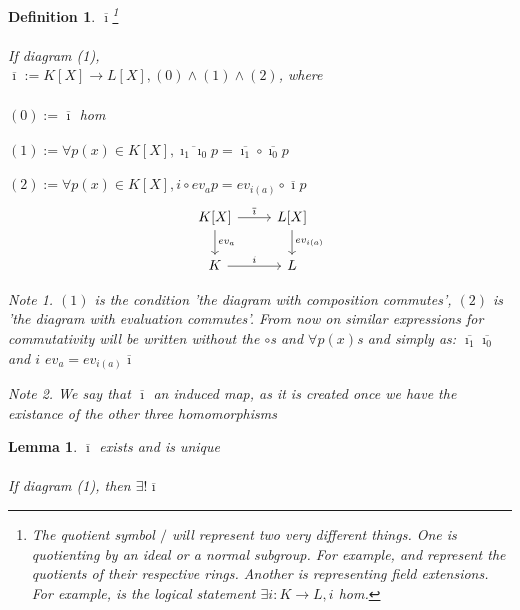 \documentclass{article}
\theoremstyle{definitionstyle}
\newtheorem{defn}{Definition}[section]
\theoremstyle{lemmastyle}
\newtheorem{lem}{Lemma}[section]
\theoremstyle{remark}
\newtheorem*{note}{Note}
\newcommand{\ibar}{\overline{\imath}}
\begin{document}
\begin{defn} $\ibar$\footnote{The quotient symbol $/$ will represent two very different things. One is quotienting by an ideal or a normal subgroup. For example,  and  represent the quotients of their respective rings. Another is representing field extensions. For example,  is the logical statement $\exists i : K \to L, i$ hom.}\\
\\

If diagram (1),\\

$\ibar := K[X] \to L[X], (0) \land (1) \land (2)$, where\\
\\
$(0) := \ibar$ hom\\
\\
$(1) := \forall p(x) \in K[X], \overline{\imath_1 \imath_0} p = \overline{\imath_1}\circ \overline{\imath_0}p$\\
\\
$(2) := \forall p(x) \in K[X], i \circ ev_a p = ev_{i(a)} \circ \overline{\imath} p$\\
\begin{equation}\begin{tikzcd}
K[X] \arrow[d, "ev_a"] \arrow[r, "\ibar"] & L[X] \arrow[d, "ev_{i(a)}"]\\
K \arrow[r, "i"]& L\end{tikzcd}\end{equation}
\begin{note} $(1)$ is the condition 'the diagram with composition commutes', $(2)$ is 'the diagram with evaluation commutes'. From now on similar expressions for commutativity will be written without the $\circ$s and $\forall p(x)$s and simply as: $\overline{\imath_1}\overline{\imath_0}$ and $i$ $ev_a = ev_{i(a)} \ibar $\end{note}
\begin{note} We say that $\overline{\imath}$ an induced map, as it is created once we have the existance of the other three homomorphisms\end{note}\end{defn}

\begin{lem} $\ibar$ exists and is unique\\
\\
If diagram (1), then $\exists ! \ibar$ \end{lem}
\end{document}
